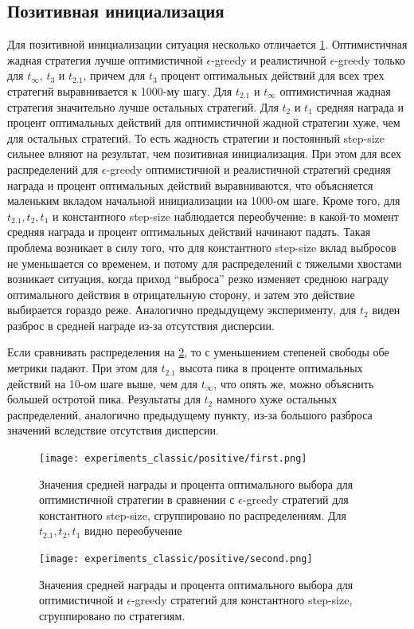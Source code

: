 \subsection{Позитивная инициализация}

Для позитивной инициализации ситуация несколько отличается \ref{fig:optimistic_1}. Оптимистичная жадная стратегия лучше оптимистичной $\epsilon$-greedy и реалистичной $\epsilon$-greedy только для $t_{\infty}$, $t_3$ и $t_{2.1}$, причем для $t_3$ процент оптимальных действий для всех трех стратегий выравнивается к 1000-му шагу. Для $t_{2.1}$ и $t_{\infty}$ оптимистичная жадная стратегия значительно лучше остальных стратегий. Для $t_2$ и $t_1$ средняя награда и процент оптимальных действий для оптимистичной жадной стратегии хуже, чем для остальных стратегий. То есть жадность стратегии и постоянный step-size сильнее влияют на результат, чем позитивная инициализация. При этом для всех распределений для $\epsilon$-greedy оптимистичной и реалистичной стратегий средняя награда и процент оптимальных действий выравниваются, что объясняется маленьким вкладом начальной инициализации на 1000-ом шаге. Кроме того, для $t_{2.1}, t_2, t_1$ и константного step-size наблюдается переобучение: в какой-то момент средняя награда и процент оптимальных действий начинают падать. Такая проблема возникает в силу того, что для константного step-size вклад выбросов не уменьшается со временем, и потому для распределений с тяжелыми хвостами возникает ситуация, когда приход ``выброса'' резко изменяет среднюю награду оптимального действия в отрицательную сторону, и затем это действие выбирается гораздо реже. Аналогично предыдущему эксперименту, для $t_2$ виден разброс в средней награде из-за отсутствия дисперсии.

Если сравнивать распределения на \ref{fig:optimistic_2}, то с уменьшением степеней свободы обе метрики падают. При этом для $t_{2.1}$ высота пика в проценте оптимальных действий на 10-ом шаге выше, чем для $t_{\infty}$, что опять же, можно объяснить большей остротой пика. Результаты для $t_{2}$ намного хуже остальных распределений, аналогично предыдущему пункту, из-за большого разброса значений вследствие отсутствия дисперсии.
\begin{figure}[ht!]
    \centering
    \texttt{[image: experiments\_classic/positive/first.png]}
    \caption{\label{fig:optimistic_1}Значения средней награды и процента оптимального выбора для оптимистичной стратегии в сравнении с $\epsilon$-greedy стратегий для константного step-size, сгруппировано по распределениям. Для $t_{2.1}, t_2, t_1$ видно переобучение}
\end{figure}
\begin{figure}[ht!]
    \centering
    \texttt{[image: experiments\_classic/positive/second.png]}
    \caption{\label{fig:optimistic_2}Значения средней награды и процента оптимального выбора для оптимистичной и $\epsilon$-greedy стратегий для константного step-size, сгруппировано по стратегиям.}
\end{figure}

